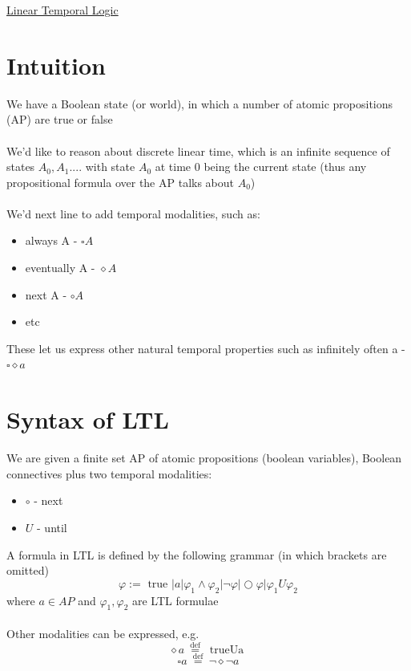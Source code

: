 \documentclass{article}[18pt]
\begin{document}
\begin{center}
\underline{\huge Linear Temporal Logic}
\end{center}
\section{Intuition}
We have a Boolean state (or world), in which a number of atomic propositions (AP) are true or false\\
\\
We'd like to reason about discrete linear time, which is an infinite sequence of states $A_0,A_1....$ with state $A_0$ at time 0 being the current state (thus any propositional formula over the AP talks about $A_0$)\\
\\
We'd next line to add temporal modalities, such as:
\begin{itemize}
	\item always A - $\square A$
	\item eventually A - $\diamond A$
	\item next A - $\circ A$
	\item etc
\end{itemize}
These let us express other natural temporal properties such as infinitely often a - $\square\diamond a$
\section{Syntax of LTL}
We are given a finite set AP of atomic propositions (boolean variables), Boolean connectives plus two temporal modalities:
\begin{itemize}
	\item $\circ$ - next
	\item $U$ - until
\end{itemize}
A formula in LTL is defined by the following grammar (in which brackets are omitted)
\[
\varphi:=\text { true }|a| \varphi_{1} \wedge \varphi_{2}|\neg \varphi| \bigcirc \varphi | \varphi_{1} U \varphi_{2}
\]
where $a\in AP$ and $\varphi_1,\varphi_2$ are LTL formulae\\
\\
Other modalities can be expressed, e.g.
\[
\diamond a \stackrel{\text { def }}{=} \text { trueUa }
\]
\[
\square a \stackrel{\text { def }}{=} \neg \diamond \neg a
\]
\end{document}
